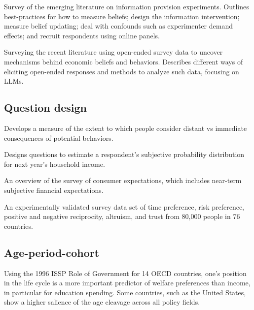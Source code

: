 \documentclass{article}
\newcommand{\citem}[1]{\medskip \noindent \textbf{\cite*{#1}}}
\begin{document}
\citem{haaland2023designing}

Survey of the emerging literature on information provision experiments. Outlines best-practices for how to measure beliefs; design the information intervention; measure belief updating; deal with confounds such as experimenter demand effects; and recruit respondents using online panels.

\citem{haaland2025understanding}

Surveying the recent literature using open-ended survey data to uncover mechanisms behind economic beliefs and behaviors. Describes different ways of eliciting open-ended responses and methods to analyze such data, focusing on LLMs.

\subsection{Question design}

\citem{strathman1994consideration}

Develops a measure of the extent to which people consider distant vs immediate consequences of potential behaviors.

\citem{dominitz1997using}

Designs questions to estimate a respondent's subjective probability distribution for next year's household income. 

\citem{armantier2017overview} 

An overview of the survey of consumer expectations, which includes near-term subjective financial expectations.

\citem{falk2018global}

An experimentally validated survey data set of time preference, risk preference, positive and negative reciprocity, altruism, and trust from 80,000 people in 76 countries.

\subsection{Age-period-cohort}

\citem{busemeyer2009attitudes}

Using the 1996 ISSP Role of Government for 14 OECD countries, one’s position in the life cycle is a more important predictor of welfare preferences than income, in particular for education spending. Some countries, such as the United States, show a higher salience of the age cleavage across all policy fields.

\citem{fullerton2010generational}
\end{document}
